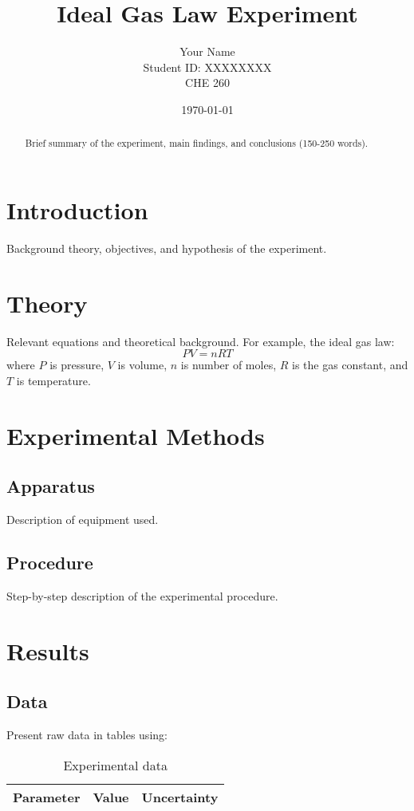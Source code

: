 \documentclass[12pt,a4paper]{article}
\title{Ideal Gas Law Experiment}
\author{Your Name \\ Student ID: XXXXXXXX \\ CHE 260}
\date{\today}
\begin{document}
\maketitle

\begin{abstract}
Brief summary of the experiment, main findings, and conclusions (150-250 words).
\end{abstract}

\section{Introduction}
Background theory, objectives, and hypothesis of the experiment.

\section{Theory}
Relevant equations and theoretical background. For example, the ideal gas law:
\begin{equation}
    PV = nRT
\end{equation}
where $P$ is pressure, $V$ is volume, $n$ is number of moles, $R$ is the gas constant, and $T$ is temperature.

\section{Experimental Methods}
\subsection{Apparatus}
Description of equipment used.

\subsection{Procedure}
Step-by-step description of the experimental procedure.

\section{Results}
\subsection{Data}
Present raw data in tables using:
\begin{table}[H]
    \centering
    \caption{Experimental data}
    \begin{tabular}{@{}ccc@{}}
        \toprule
        Parameter & Value & Uncertainty \\
        \midrule
        \bottomrule
    \end{tabular}
\end{table}
\end{document}
